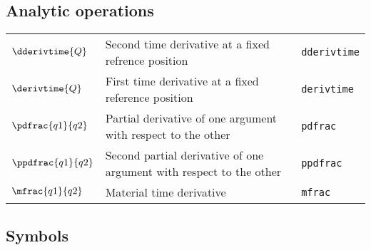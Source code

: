 \subsection*{Analytic operations}
\begin{tabular}{l l l}
$\dderivtime{Q}$ & Second time derivative at a fixed refrence position& \texttt{dderivtime}\\
$\derivtime{Q}$ & First time derivative at a fixed reference position& \texttt{derivtime}\\
$\pdfrac{q1}{q2}$ & Partial derivative of one argument with respect to the other& \texttt{pdfrac}\\
$\ppdfrac{q1}{q2}$ & Second partial derivative of one argument with respect to the other& \texttt{ppdfrac}\\
$\mfrac{q1}{q2}$ & Material time derivative& \texttt{mfrac}\\
\end{tabular}

\subsection*{Symbols}

